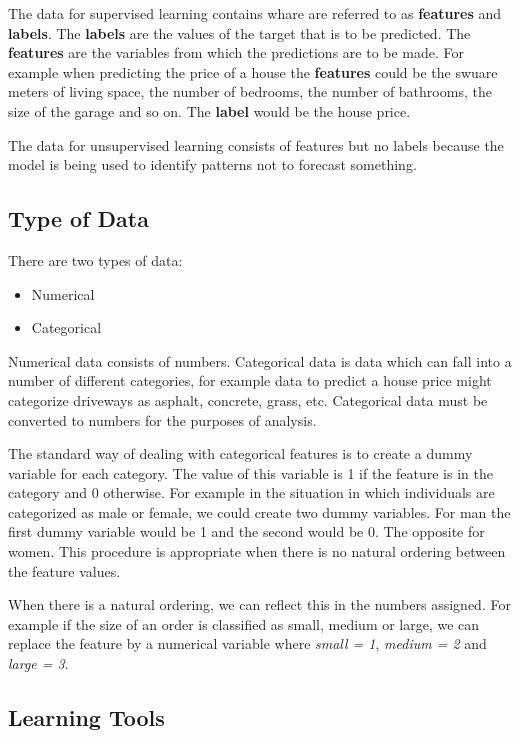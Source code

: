 \documentclass[11pt]{article}
\providecommand{\tightlist}{%
      \setlength{\itemsep}{0pt}\setlength{\parskip}{0pt}}
\begin{document}
The data for supervised learning contains whare are referred to as
\textbf{features} and \textbf{labels}. The \textbf{labels} are the
values of the target that is to be predicted. The \textbf{features} are
the variables from which the predictions are to be made. For example
when predicting the price of a house the \textbf{features} could be the
swuare meters of living space, the number of bedrooms, the number of
bathrooms, the size of the garage and so on. The \textbf{label} would be
the house price.

The data for unsupervised learning consists of features but no labels
because the model is being used to identify patterns not to forecast
something.

    \hypertarget{type-of-data}{%
\subsection{Type of Data}\label{type-of-data}}

There are two types of data:

\begin{itemize}
\tightlist
\item
  Numerical
\item
  Categorical
\end{itemize}

Numerical data consists of numbers. Categorical data is data which can
fall into a number of different categories, for example data to predict
a house price might categorize driveways as asphalt, concrete, grass,
etc. Categorical data must be converted to numbers for the purposes of
analysis.

The standard way of dealing with categorical features is to create a
dummy variable for each category. The value of this variable is 1 if the
feature is in the category and 0 otherwise. For example in the situation
in which individuals are categorized as male or female, we could create
two dummy variables. For man the first dummy variable would be 1 and the
second would be 0. The opposite for women. This procedure is appropriate
when there is no natural ordering between the feature values.

When there is a natural ordering, we can reflect this in the numbers
assigned. For example if the size of an order is classified as small,
medium or large, we can replace the feature by a numerical variable
where \emph{small = 1}, \emph{medium = 2} and \emph{large = 3}.

    \hypertarget{learning-tools}{%
\subsection{Learning Tools}\label{learning-tools}}
\end{document}
